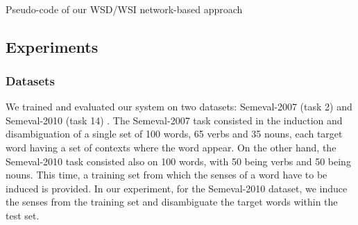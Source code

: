 ~

\begin{algorithm}[t]
\SetAlgoLined
{}


\caption{Pseudo-code of our WSD/WSI network-based approach}
\label{alg:wsd}
\end{algorithm}

	
\subsection{Experiments}

\subsubsection{Datasets}
We trained and evaluated our system on two datasets: Semeval-2007 (task 2) \cite{semeval2007task2} and Semeval-2010 (task 14) \cite{Semeval2010}. The Semeval-2007 task consisted in the induction and disambiguation of a single set of 100 words, 65 verbs and 35 nouns, each target word having a set of contexts where the word appear. On the other hand, the Semeval-2010 task consisted also on 100 words, with 50 being verbs and 50 being nouns. This time, a training set from which the senses of a word have to be induced is provided. In our experiment, for the Semeval-2010 dataset, we induce the senses from the training set and disambiguate the target words within the test set.

